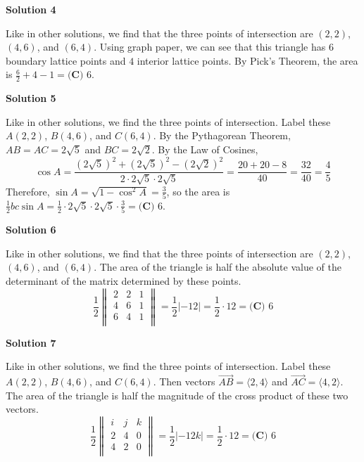 \begin{enumerate}
 



\textbf{Solution 4}

Like in other solutions, we find that the three points of intersection are  $(2, 2)$, $(4, 6)$, and $(6, 4)$. Using graph paper, we can see that this triangle has $6$ boundary lattice points and $4$ interior lattice points. By Pick's Theorem, the area is $\frac62 + 4 - 1 = \boxed{\textbf{(C) }6}$.

 



\textbf{Solution 5}

Like in other solutions, we find the three points of intersection. Label these $A (2, 2)$, $B (4, 6)$, and $C (6, 4)$. By the Pythagorean Theorem, $AB = AC = 2\sqrt5$ and $BC = 2\sqrt2$. By the Law of Cosines,
 \[\cos A = \frac{(2\sqrt5)^2 + (2\sqrt5)^2 - (2\sqrt2)^2}{2 \cdot 2\sqrt5 \cdot 2\sqrt5} = \frac{20 + 20 - 8}{40} = \frac{32}{40} = \frac45\]Therefore, $\sin A = \sqrt{1 - \cos^2 A} = \frac35$, so the area is $\frac12 bc \sin A = \frac12 \cdot 2\sqrt5 \cdot 2\sqrt5 \cdot \frac35 = \boxed{\textbf{(C) }6}$.

 



\textbf{Solution 6}

Like in other solutions, we find that the three points of intersection are  $(2, 2)$, $(4, 6)$, and $(6, 4)$. The area of the triangle is half the absolute value of the determinant of the matrix determined by these points.
 \[\frac12\begin{Vmatrix} 2&2&1\\ 4&6&1\\ 6&4&1\\ \end{Vmatrix} = \frac12|-12| = \frac12 \cdot 12 = \boxed{\textbf{(C) }6}\]




\textbf{Solution 7}

Like in other solutions, we find the three points of intersection. Label these $A (2, 2)$, $B (4, 6)$, and $C (6, 4)$. Then vectors $\overrightarrow{AB} = \langle 2, 4 \rangle$ and $\overrightarrow{AC} = \langle 4, 2 \rangle$. The area of the triangle is half the magnitude of the cross product of these two vectors.
 \[\frac12\begin{Vmatrix} i&j&k\\ 2&4&0\\ 4&2&0\\ \end{Vmatrix} = \frac12|-12k| = \frac12 \cdot 12 = \boxed{\textbf{(C) }6}\]





\end{enumerate}
